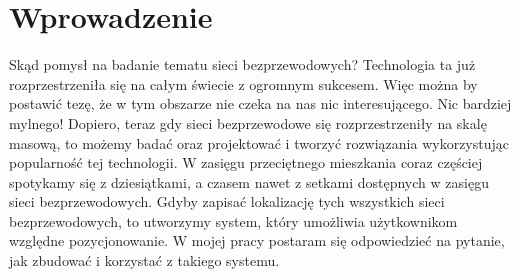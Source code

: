 \chapter*{Wprowadzenie}
\label{ch:wprowadz}

Skąd pomysł na badanie tematu sieci bezprzewodowych? Technologia ta już rozprzestrzeniła się na całym świecie z ogromnym sukcesem. Więc można by postawić tezę, że w tym obszarze nie czeka na nas nic interesującego. Nic bardziej mylnego! Dopiero, teraz gdy sieci bezprzewodowe się rozprzestrzeniły na skalę masową, to możemy badać oraz projektować i tworzyć rozwiązania wykorzystując popularność tej technologii. W zasięgu przeciętnego mieszkania coraz częściej spotykamy się z dziesiątkami, a czasem nawet z setkami dostępnych w zasięgu sieci bezprzewodowych. Gdyby zapisać lokalizację tych wszystkich sieci bezprzewodowych, to utworzymy system, który umożliwia użytkownikom względne pozycjonowanie. W mojej pracy postaram się odpowiedzieć na pytanie, jak zbudować i korzystać z takiego systemu.
